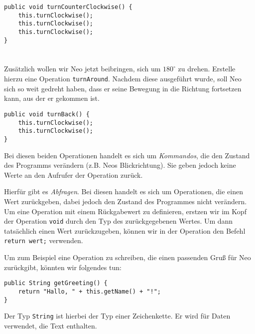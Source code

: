 \begin{questions}
\begin{parts}
    \begin{solution}
    \begin{lstlisting}
public void turnCounterClockwise() {
    this.turnClockwise();
    this.turnClockwise();
    this.turnClockwise();
}
    \end{lstlisting}
    \end{solution}

    \part{}
    Zusätzlich wollen wir Neo jetzt beibringen, sich um \(180^\circ\) zu drehen.
    Erstelle hierzu eine Operation \lstinline{turnAround}.
    Nachdem diese ausgeführt wurde, soll Neo sich so weit gedreht haben, dass er seine Bewegung in die Richtung fortsetzen kann, aus der er gekommen ist.

    \begin{solution}
    \begin{lstlisting}
public void turnBack() {
    this.turnClockwise();
    this.turnClockwise();
}
    \end{lstlisting}
    \end{solution}
    \end{parts}

    Bei diesen beiden Operationen handelt es sich um \emph{Kommandos}, die den Zustand des Programms verändern (z.B. Neos Blickrichtung). Sie geben jedoch keine Werte an den Aufrufer der Operation zurück.

    Hierfür gibt es \emph{Abfragen}. Bei diesen handelt es sich um Operationen, die einen Wert zurückgeben, dabei jedoch den Zustand des Programmes nicht verändern. Um eine Operation mit einem Rückgabewert zu definieren, erstzen wir im Kopf der Operation \lstinline{void} durch den Typ des zurückgegebenen Wertes. Um dann tatsächlich einen Wert zurückzugeben, können wir in der Operation den Befehl \lstinline{return wert;} verwenden.

    Um zum Beispiel eine Operation zu schreiben, die einen passenden Gruß für Neo zurückgibt, könnten wir folgendes tun:
    \begin{lstlisting}
public String getGreeting() {
    return "Hallo, " + this.getName() + "!";
}
    \end{lstlisting}
    Der Typ \lstinline{String} ist hierbei der Typ einer Zeichenkette. Er wird für Daten verwendet, die Text enthalten.

    \begin{parts}
    \setcounter{partno}{2}

\end{parts}
\end{questions}
